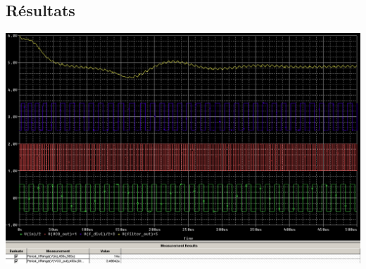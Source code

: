 \documentclass{article}
\begin{document}
\subsection{Résultats}

\includegraphics[width=\linewidth]{multi_sim.png}
\end{document}
